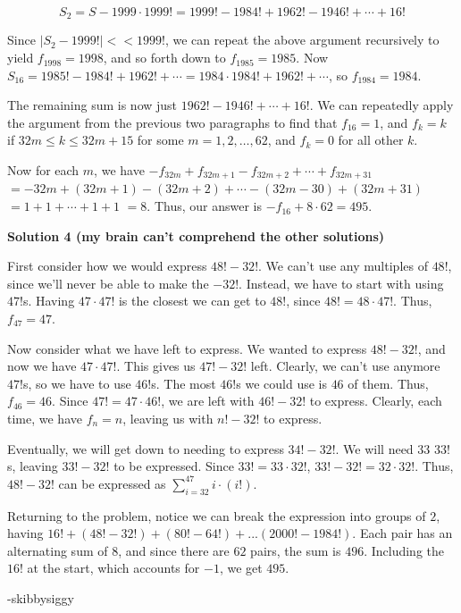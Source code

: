 \begin{enumerate}
 
 \[S_2 = S - 1999 \cdot 1999! = 1999! - 1984! + 1962! - 1946! + \cdots + 16!\]

 Since $|S_2 - 1999!| << 1999!$, we can repeat the above argument recursively to yield $f_{1998} = 1998$, and so forth down to $f_{1985} = 1985$. Now $S_{16} = 1985! - 1984! + 1962! + \cdots = 1984 \cdot 1984! + 1962! + \cdots$, so $f_{1984} = 1984$. 

 The remaining sum is now just $1962! - 1946! + \cdots + 16!$. We can repeatedly apply the argument from the previous two paragraphs to find that $f_{16} = 1$, and $f_k=k$ if $32m\le k \le 32m+15$ for some $m=1,2,\ldots,62$, and $f_k = 0$ for all other $k$.

 Now for each $m$, we have $-f_{32m} + f_{32m+1} - f_{32m+2} + \cdots + f_{32m + 31}$ $= -32m + (32m + 1) - (32m + 2) + \cdots - (32m - 30) + (32 m + 31)$ $= 1 + 1 + \cdots + 1 + 1$ $= 8$. Thus, our answer is $-f_{16} + 8 \cdot 62 = \boxed{495}$.

 



\textbf{Solution 4 (my brain can't comprehend the other solutions)}

First consider how we would express $48!-32!$. We can't use any multiples of $48!$, since we'll never be able to make the $-32!$. Instead, we have to start with using $47!$s. Having $47\cdot47!$ is the closest we can get to $48!$, since $48! = 48\cdot 47!$. Thus, $f_{47}=47$.

 
Now consider what we have left to express. We wanted to express $48!-32!$, and now we have $47\cdot 47!$. This gives us $47!-32!$ left. Clearly, we can't use anymore $47!$s, so we have to use $46!$s. The most $46!$s we could use is $46$ of them. Thus, $f_{46}=46$. Since $47!=47\cdot 46!$, we are left with $46!-32!$ to express. Clearly, each time, we have $f_n = n$, leaving us with $n!-32!$ to express.

 
Eventually, we will get down to needing to express $34!-32!$. We will need $33$ $33!$s, leaving $33!-32!$ to be expressed. Since $33!=33\cdot 32!$, $33!-32! = 32\cdot 32!$. Thus, $48!-32!$ can be expressed as $\sum_{i=32}^{47} i\cdot (i!)$.

 
Returning to the problem, notice we can break the expression into groups of $2$, having $16!+(48!-32!)+(80!-64!)+...(2000!-1984!)$. Each pair has an alternating sum of $8$, and since there are $62$ pairs, the sum is $496$. Including the $16!$ at the start, which accounts for $-1$, we get $\boxed{495}$.

 -skibbysiggy


\end{enumerate}
